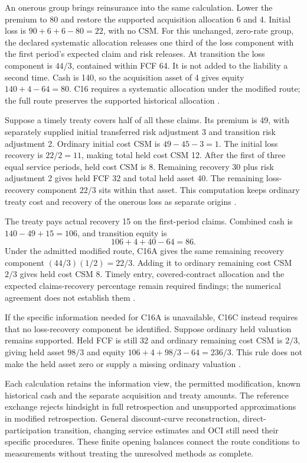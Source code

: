 An onerous group brings reinsurance into the same calculation. Lower the premium
to 80 and restore the supported acquisition allocation 6 and 4. Initial loss
is \(90+6+6-80=22\), with no CSM. For this unchanged, zero-rate group,
the declared systematic allocation releases one third of the loss component
with the first period's expected claim and risk releases. At transition the
loss component is \(44/3\), contained within FCF 64. It is not added to
the liability a second time. Cash is 140, so the acquisition asset of 4 gives
equity \(140+4-64=80\). C16 requires a systematic allocation under the
modified route; the full route preserves the supported historical allocation
\citep[IFRS~17.49--52,C16]{eu20231803}.

Suppose a timely treaty covers half of all these claims. Its premium is 49,
with separately supplied initial transferred risk adjustment 3 and transition
risk adjustment 2. Ordinary initial cost CSM is \(49-45-3=1\).
The initial loss recovery is \(22/2=11\), making total held cost CSM 12.
After the first of three equal service periods, held cost CSM is 8. Remaining
recovery 30 plus risk adjustment 2 gives held FCF 32 and total held asset 40.
The remaining loss-recovery component \(22/3\) sits within that asset.
This computation keeps ordinary treaty cost and recovery of the onerous loss
as separate origins \citep[IFRS~17.66--66B,B119C--B119F]{eu20231803}.

The treaty pays actual recovery 15 on the first-period claims. Combined cash
is \(140-49+15=106\), and transition equity is
\[
 106+4+40-64=86.
\]
Under the admitted modified route, C16A gives the same remaining recovery
component \((44/3)(1/2)=22/3\). Adding it to ordinary remaining cost CSM
\(2/3\) gives held cost CSM 8. Timely entry, covered-contract allocation and
the expected claims-recovery percentage remain required findings; the numerical
agreement does not establish them \citep[IFRS~17.C16A--C16B]{eu20231803}.

If the specific information needed for C16A is unavailable, C16C instead
requires that no loss-recovery component be identified. Suppose ordinary held
valuation remains supported. Held FCF is still 32 and ordinary remaining cost
CSM is \(2/3\), giving held asset \(98/3\) and equity
\(106+4+98/3-64=236/3\). This rule does not make the held asset zero or
supply a missing ordinary valuation \citep[IFRS~17.C16C]{eu20231803}.

Each calculation retains the information view, the permitted modification,
known historical cash and the separate acquisition and treaty amounts. The
reference exchange rejects hindsight in full retrospection and unsupported
approximations in modified retrospection. General discount-curve reconstruction,
direct-participation transition, changing service estimates and OCI still need
their specific procedures. These finite opening balances connect the route
conditions to measurements without treating the unresolved methods as complete.
